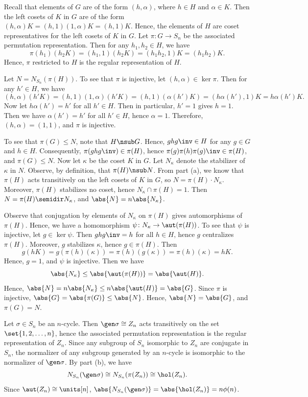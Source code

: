 \begin{solenum}
    \item Recall that elements of $G$ are of the form $(h, \alpha)$, where $h \in H$ and $\alpha \in K$.
	Then the left cosets of $K$ in $G$ are of the form $(h, \alpha)K = (h, 1)(1, \alpha)K = (h, 1)K$.
	Hence, the elements of $H$ are coset representatives for the left cosets of $K$ in $G$.
	Let $\pi \colon G \to S_n$ be the associated permutation representation.
	Then for any $h_1, h_2 \in H$, we have
    \[
    	\pi(h_1)(h_2K) = (h_1, 1)(h_2K) = (h_1h_2, 1)K = (h_1h_2)K.
    \]
    Hence, $\pi$ restricted to $H$ is the regular representation of $H$.
    \item Let $N = N_{S_n}(\pi(H))$.
	To see that $\pi$ is injective, let $(h, \alpha) \in \ker\pi$.
	Then for any $h' \in H$, we have
    \[
    	(h, \alpha)(h'K) = (h, 1)(1, \alpha)(h'K) = (h, 1)(\alpha(h')K) = (h\alpha(h'), 1)K = h\alpha(h')K.
    \]
    Now let $h\alpha(h') = h'$ for all $h' \in H$.
	Then in particular, $h' = 1$ gives $h = 1$.
	Then we have $\alpha(h') = h'$ for all $h' \in H$, hence $\alpha = 1$.
	Therefore, $(h, \alpha) = (1, 1)$, and $\pi$ is injective.

    To see that $\pi(G) \leq N$, note that $H \nsub G$.
	Hence, $ghg\inv \in H$ for any $g \in G$ and $h \in H$.
	Consequently, $\pi(ghg\inv) \in \pi(H)$, hence $\pi(g)\pi(h)\pi(g)\inv \in \pi(H)$, and $\pi(G) \leq N$.
	Now let $\kappa$ be the coset $K$ in $G$.
	Let $N_\kappa$ denote the stabilizer of $\kappa$ in $N$.
	Observe, by definition, that $\pi(H) \nsub N$.
	From part (a), we know that $\pi(H)$ acts transitively on the left cosets of $K$ in $G$, so $N = \pi(H) \cdot N_\kappa$.
	Moreover, $\pi(H)$ stabilizes no coset, hence $N_\kappa \cap \pi(H) = 1$.
	Then $N = \pi(H) \semidir N_\kappa$, and $\abs{N} = n\abs{N_\kappa}$.

    Observe that conjugation by elements of $N_\kappa$ on $\pi(H)$ gives automorphisms of $\pi(H)$.
	Hence, we have a homomorphism $\psi \colon N_\kappa \to \aut(\pi(H))$.
	To see that $\psi$ is injective, let $g \in \ker\psi$.
	Then $ghg\inv = h$ for all $h \in H$, hence $g$ centralizes $\pi(H)$.
	Moreover, $g$ stabilizes $\kappa$, hence $g \in \pi(H)$.
	Then
    \[
    	g(hK) = g(\pi(h)(\kappa)) = \pi(h)(g(\kappa)) = \pi(h)(\kappa) = hK.
    \]
    Hence, $g = 1$, and $\psi$ is injective.
	Then we have
    \[
    	\abs{N_\kappa} \leq \abs{\aut(\pi(H))} = \abs{\aut(H)}.
    \]
    Hence, $\abs{N} = n\abs{N_\kappa} \leq n\abs{\aut(H)} = \abs{G}$.
	Since $\pi$ is injective, $\abs{G} = \abs{\pi(G)} \leq \abs{N}$.
	Hence, $\abs{N} = \abs{G}$, and $\pi(G) = N$.
    \item Let $\sigma \in S_n$ be an $n$-cycle.
	Then $\gen\sigma \cong Z_n$ acts transitively on the set $\set{1, 2, \ldots, n}$, hence the associated permutation representation is the regular representation of $Z_n$.
	Since any subgroup of $S_n$ isomorphic to $Z_n$ are conjugate in $S_n$, the normalizer of any subgroup generated by an $n$-cycle is isomorphic to the normalizer of $\gen\sigma$.
	By part (b), we have
    \[
    	N_{S_n}(\gen\sigma) \cong N_{S_n}(\pi(Z_n)) \cong \hol(Z_n).
    \]
    Since $\aut(Z_n) \cong \units[n]$, $\abs{N_{S_n}(\gen\sigma)} = \abs{\hol(Z_n)} = n\phi(n)$.
\end{solenum}

